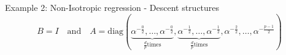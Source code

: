 \documentclass[10pt]{beamer}
\begin{document}
\begin{frame}{Example 2: Non-Isotropic regression - Descent structures}
  \vspace*{-0.5cm}
  \begin{equation*}
  B=I \quad \text{and} \quad A = \text{diag}(\underset{\frac{d}{p} \text{times}}{\underbrace{\alpha^{-\frac{0}{2}}, \ldots, \alpha^{-\frac{0}{2}}}}, 
  \underset{\frac{d}{p} \text{times}}{\underbrace{\alpha^{-\frac{1}{2}}, \ldots, \alpha^{-\frac{1}{2}}}}, \alpha^{-\frac{2}{2}}, \ldots, \alpha^{-\frac{p-1}{2}})
  \end{equation*}

  \vspace*{-0.5cm}
  \begin{columns}
    \begin{column}{0.5\textwidth}

    \begin{center}

      \cite{nakkiran2020optimal}
    \end{center}


\end{column}
\end{columns}
\end{frame}
\end{document}
